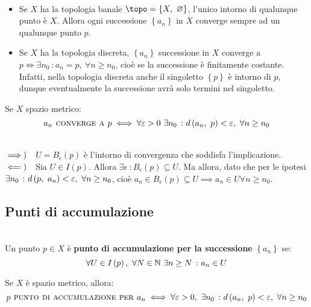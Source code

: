 \begin{examples}~{}
	\begin{itemize}
		\item Se $X$ ha la topologia banale $\topo=\left\{X,\ \emptyset\right\}$, l'unico intorno di qualunque punto è $X$. Allora ogni successione $\left\{a_n\right\}$ in $X$ converge sempre ad un qualunque punto $p$.
		\item Se $X$ ha la topologia discreta, $\left\{a_n\right\}$ successione in $X$ converge a $p\iff \exists n_0\ \colon a_n=p,\ \forall n\geq n_0$, cioè se la successione è finitamente costante. Infatti, nella topologia discreta anche il singoletto $\left\{p\right\}$ è intorno di $p$, dunque eventualmente la successione avrà solo termini nel singoletto.
	\end{itemize}
\vspace{-3mm}
\end{examples}
\begin{observe}
Se $X$ spazio metrico:
\begin{equation}
	a_n\textsc{ converge a } p\iff \forall \varepsilon>0\ \exists n_0\ \colon d\left(a_n,\ p\right)<\varepsilon,\ \forall n\geq n_0
\end{equation}
\vspace{-6mm}
\end{observe}
\begin{demonstration}~{}\\
	$\implies)\quad$$U=B_{\epsilon}\left(p\right)$ è l'intorno di convergenza che soddisfa l'implicazione.\\
	$\impliedby)\quad$Sia $U\in I\left(p\right)$. Allora $\exists \epsilon\ \colon B_{\epsilon}\left(p\right)\subseteq U$. Ma allora, dato che per le ipotesi $\exists n_0\ \colon d\left(p,\ a_n\right)<\varepsilon,\ \forall n\geq n_0$, cioè $a_n\in B_{\epsilon}\left(p\right)\subseteq U\implies a_n\in U\forall n\geq n_0$.
\end{demonstration}
\subsection{Punti di accumulazione}
\begin{define}~{}\\
	Un punto $p\in X$ è \textbf{punto di accumulazione per la successione} $\left\{a_n\right\}$ se:
	\begin{equation}
		\forall U\in I\left(p\right),\ \forall N\in\mathbb{N}\ \exists n\geq N\ \colon a_n\in U
	\end{equation}
\vspace{-6mm}
\end{define}
\begin{exercise}
	Se $X$ è spazio metrico, allora:
	\begin{equation}
		p\textsc{ punto di accumulazione per } a_n\iff \forall \epsilon>0,\ \exists n_0\ \colon \mvf{d}{a_n}{p}<\epsilon,\ \forall n\geq n_0
	\end{equation}
\vspace{-6mm}
\end{exercise}

